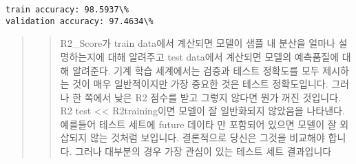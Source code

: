 \documentclass[11pt]{article}
\begin{document}
    \begin{Verbatim}[commandchars=\\\{\}]
train accuracy: 98.5937\%
validation accuracy: 97.4634\%
    \end{Verbatim}

    \begin{quote}
\begin{quote}
R2\_Score가 train data에서 계산되면 모델이 샘플 내 분산을 얼마나
설명하는지에 대해 알려주고 test data에서 계산되면 모델의 예측품질에 대해
알려준다. 기계 학습 세계에서는 검증과 테스트 정확도를 모두 제시하는 것이
매우 일반적이지만 가장 중요한 것은 테스트 정확도입니다. 그러나 한 쪽에서
낮은 R2 점수를 받고 그렇지 않다면 뭔가 꺼진 것입니다. R2 test
\textless\textless{} R2training이면 모델이 잘 일반화되지 않았음을
나타낸다. 예를들어 테스트 세트에 future 데이타 만 포함되어 있으면 모델이
잘 외삽되지 않는 것처럼 보입니다. 결론적으로 당신은 그것을 비교해야
합니다. 그러나 대부분의 경우 가장 관심이 있는 테스트 세트 결과입니다
\end{quote}
\end{quote}
\end{document}
